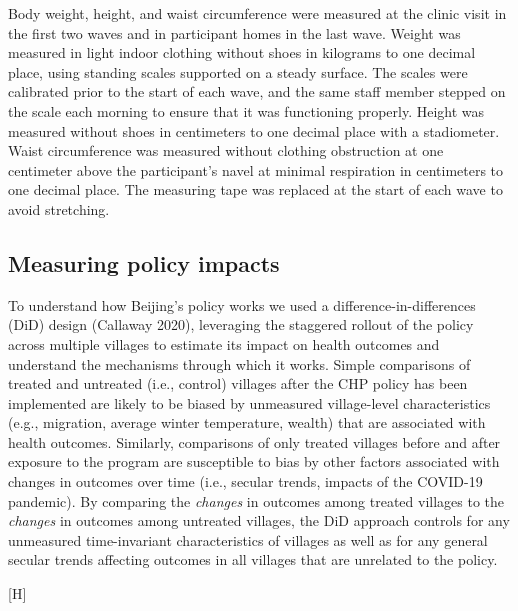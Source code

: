 \documentclass[
  letterpaper,
  DIV=11,
  numbers=noendperiod]{scrartcl}
\makeatletter
\renewenvironment{figure}%
   {\renewcommand\familydefault\sfdefault
    \@float{figure}}
   {\end@float}
\makeatother
\begin{document}
Body weight, height, and waist circumference were measured at the clinic
visit in the first two waves and in participant homes in the last wave.
Weight was measured in light indoor clothing without shoes in kilograms
to one decimal place, using standing scales supported on a steady
surface. The scales were calibrated prior to the start of each wave, and
the same staff member stepped on the scale each morning to ensure that
it was functioning properly. Height was measured without shoes in
centimeters to one decimal place with a stadiometer. Waist circumference
was measured without clothing obstruction at one centimeter above the
participant's navel at minimal respiration in centimeters to one decimal
place. The measuring tape was replaced at the start of each wave to
avoid stretching.

\subsection{Measuring policy impacts}\label{measuring-policy-impacts}

To understand how Beijing's policy works we used a
difference-in-differences (DiD) design (Callaway 2020), leveraging the
staggered rollout of the policy across multiple villages to estimate its
impact on health outcomes and understand the mechanisms through which it
works. Simple comparisons of treated and untreated (i.e., control)
villages after the CHP policy has been implemented are likely to be
biased by unmeasured village-level characteristics (e.g., migration,
average winter temperature, wealth) that are associated with health
outcomes. Similarly, comparisons of only treated villages before and
after exposure to the program are susceptible to bias by other factors
associated with changes in outcomes over time (i.e., secular trends,
impacts of the COVID-19 pandemic). By comparing the \emph{changes} in
outcomes among treated villages to the \emph{changes} in outcomes among
untreated villages, the DiD approach controls for any unmeasured
time-invariant characteristics of villages as well as for any general
secular trends affecting outcomes in all villages that are unrelated to
the policy.

\begin{figure}[H]


\caption{\label{fig-didfig}Stylized example of
difference-in-differences}

\end{figure}%
\end{document}
